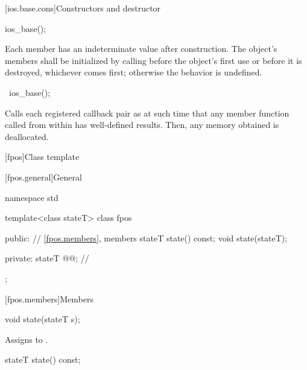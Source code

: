 [ios.base.cons]{Constructors and destructor}

%
\begin{itemdecl}
ios_base();
\end{itemdecl}

\begin{itemdescr}
\pnum
\effects
Each
member has an indeterminate value after construction.
The object's members shall be initialized by calling
before the object's first use or before it is destroyed, whichever comes first; otherwise
the behavior is undefined.
\end{itemdescr}

%
\begin{itemdecl}
~ios_base();
\end{itemdecl}

\begin{itemdescr}
\pnum
\effects
Calls each registered callback pair
 as
at such time that any
member function called from within
has well-defined results.
Then, any memory obtained is deallocated.
\end{itemdescr}

[fpos]{Class template }

[fpos.general]{General}

%
\begin{codeblock}
namespace std {
  template<class stateT> class fpos {
  public:
    // \ref{fpos.members}, members
    stateT state() const;
    void state(stateT);

  private:
    stateT @@;                  // \expos
  };
}
\end{codeblock}

[fpos.members]{Members}

%
\begin{itemdecl}
void state(stateT s);
\end{itemdecl}

\begin{itemdescr}
\pnum
\effects
Assigns  to .
\end{itemdescr}

%
\begin{itemdecl}
stateT state() const;
\end{itemdecl}

